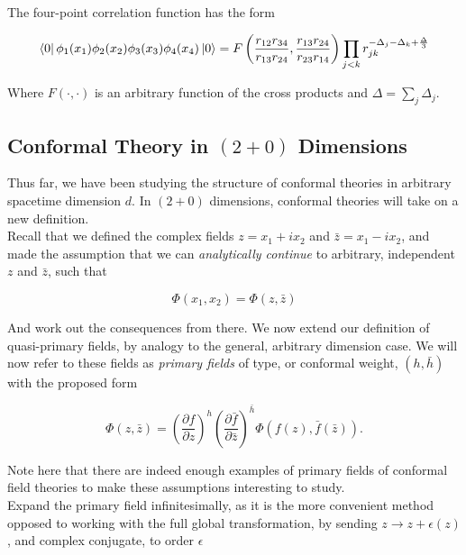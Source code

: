 \noindent The four-point correlation function has the form

\begin{equation}
\bra{0} \phi_1 (x_1) \phi_2 (x_2) \phi_3 (x_3) \phi_4 (x_4) \ket{0} = F \left( \frac{r_{12} r_{34}}{r_{13} r_{24}}, \frac{r_{13} r_{24}}{r_{23} r_{14}} \right) \prod_{j<k} r_{jk}^{-\Delta_j - \Delta_k + \frac{\Delta}{3}}
\end{equation}

\noindent Where $F(\cdot,\cdot)$ is an arbitrary function of the cross products and $\Delta = \sum_j \Delta_j$.

\subsection*{Conformal Theory in $(2+0)$ Dimensions}

\noindent Thus far, we have been studying the structure of conformal theories in arbitrary spacetime dimension $d$. In $(2+0)$ dimensions, conformal theories will take on a new definition. \\

\noindent Recall that we defined the complex fields $z = x_1 + i x_2$ and $\bar{z} = x_1 - i x_2$, and made the assumption that we can \textit{analytically continue} to arbitrary, independent $z$ and $\bar{z}$, such that

\begin{equation}
\Phi(x_1,x_2) = \Phi(z,\bar{z})
\end{equation}

\noindent And work out the consequences from there. We now extend our definition of quasi-primary fields, by analogy to the general, arbitrary dimension case. We will now refer to these fields as \textit{primary fields} of type, or conformal weight, $(h, \bar{h})$ with the proposed form

\begin{equation}
\Phi (z, \bar{z}) = \left( \frac{\partial f}{\partial z} \right)^h \left( \frac{\partial \bar{f}}{\partial \bar{z}} \right)^{\bar{h}} \Phi (f(z), \bar{f} (\bar{z})).
\end{equation}

\noindent Note here that there are indeed enough examples of primary fields of conformal field theories to make these assumptions interesting to study. \\

\noindent Expand the primary field infinitesimally, as it is the more convenient method opposed to working with the full global transformation, by sending $z \rightarrow z + \epsilon(z)$, and complex conjugate, to order $\epsilon$

